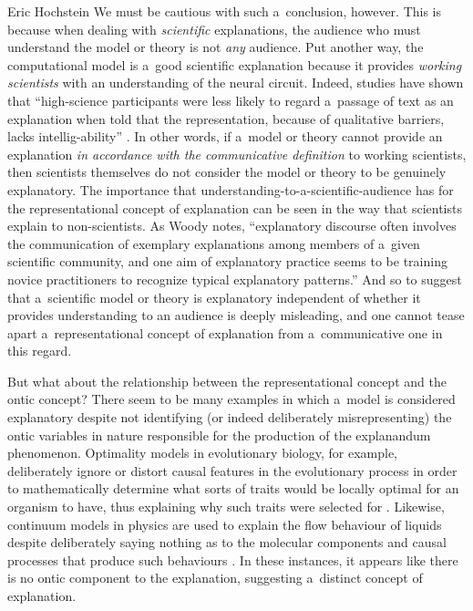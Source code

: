 \begin{artengenv}{Eric Hochstein}
We must be cautious with such a~conclusion, however. This is because when dealing with \textit{scientific} explanations, the audience who must understand the model or theory is not \textit{any} audience. Put another way, the computational model is a~good scientific explanation because it provides \textit{working scientists} with an understanding of the neural circuit. Indeed, studies have shown that ``high-science participants were less likely to regard a~passage of text as an explanation when told that the representation, because of qualitative barriers, lacks intellig-ability''
\parencite[][p.1372]{braverman_intelligibility_2012}. %
 In other words, if a~model or theory cannot provide an explanation \textit{in accordance with the communicative definition} to working scientists, then scientists themselves do not consider the model or theory to be genuinely explanatory. The importance that understanding-to-a-scientific-audience has for the representational concept of explanation can be seen in the way that scientists explain to non-scientists. As Woody 
\parencite*[][p.81]{woody_re-orienting_2015} %
 notes, ``explanatory discourse often involves the communication of exemplary explanations among members of a~given scientific community, and one aim of explanatory practice seems to be training novice practitioners to recognize typical explanatory patterns.'' And so to suggest that a~scientific model or theory is explanatory independent of whether it provides understanding to an audience is deeply misleading, and one cannot tease apart a~representational concept of explanation from a~communicative one in this regard.

But what about the relationship between the representational concept and the ontic concept? There seem to be many examples in which a~model is considered explanatory despite not identifying (or indeed deliberately misrepresenting) the ontic variables in nature responsible for the production of the explanandum phenomenon. Optimality models in evolutionary biology, for example, deliberately ignore or distort causal features in the evolutionary process in order to mathematically determine what sorts of traits would be locally optimal for an organism to have, thus explaining why such traits were selected for
\parencites[][]{potochnik_explanatory_2010}[][]{woods_virtuous_2010}[][]{rice_moving_2015}. %
 Likewise, continuum models in physics are used to explain the flow behaviour of liquids despite deliberately saying nothing as to the molecular components and causal processes that produce such behaviours 
\parencites[][]{batterman_minimal_2014}[][]{izadi_building_2014}[][p.803]{bokulich_representing_2018}. %
 In these instances, it appears like there is no ontic component to the explanation, suggesting a~distinct concept of explanation.


\end{artengenv}
